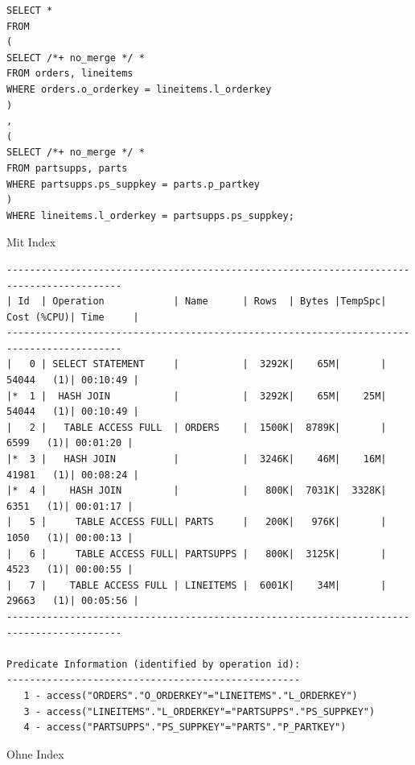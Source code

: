 \documentclass[10pt]{article}
\begin{document}
\begin{lstlisting}[style=sql]
SELECT *
FROM
(
SELECT /*+ no_merge */ *
FROM orders, lineitems
WHERE orders.o_orderkey = lineitems.l_orderkey
)
,
(
SELECT /*+ no_merge */ *
FROM partsupps, parts
WHERE partsupps.ps_suppkey = parts.p_partkey
)
WHERE lineitems.l_orderkey = partsupps.ps_suppkey;
\end{lstlisting}
Mit Index
\begin{lstlisting}[style=queryexecutionplan]
------------------------------------------------------------------------------------------
| Id  | Operation            | Name      | Rows  | Bytes |TempSpc| Cost (%CPU)| Time     |
------------------------------------------------------------------------------------------
|   0 | SELECT STATEMENT     |           |  3292K|    65M|       | 54044   (1)| 00:10:49 |
|*  1 |  HASH JOIN           |           |  3292K|    65M|    25M| 54044   (1)| 00:10:49 |
|   2 |   TABLE ACCESS FULL  | ORDERS    |  1500K|  8789K|       |  6599   (1)| 00:01:20 |
|*  3 |   HASH JOIN          |           |  3246K|    46M|    16M| 41981   (1)| 00:08:24 |
|*  4 |    HASH JOIN         |           |   800K|  7031K|  3328K|  6351   (1)| 00:01:17 |
|   5 |     TABLE ACCESS FULL| PARTS     |   200K|   976K|       |  1050   (1)| 00:00:13 |
|   6 |     TABLE ACCESS FULL| PARTSUPPS |   800K|  3125K|       |  4523   (1)| 00:00:55 |
|   7 |    TABLE ACCESS FULL | LINEITEMS |  6001K|    34M|       | 29663   (1)| 00:05:56 |
------------------------------------------------------------------------------------------
 
Predicate Information (identified by operation id):
---------------------------------------------------
   1 - access("ORDERS"."O_ORDERKEY"="LINEITEMS"."L_ORDERKEY")
   3 - access("LINEITEMS"."L_ORDERKEY"="PARTSUPPS"."PS_SUPPKEY")
   4 - access("PARTSUPPS"."PS_SUPPKEY"="PARTS"."P_PARTKEY")
\end{lstlisting}
Ohne Index
\end{document}
